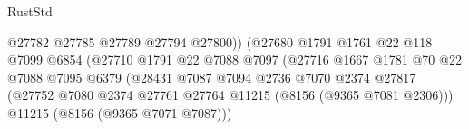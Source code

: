 \begin{lexlean}{RustStd}
\begin{coremodule}
                                                        @27782
                                                        @27785
                                                        @27789
                                                        @27794
                                                        @27800))
                                                    (@27680
                                                      @1791
                                                      @1761
                                                      @22
                                                      @118
                                                      @7099
                                                      @6854
                                                      (@27710
                                                        @1791
                                                        @22
                                                        @7088
                                                        @7097
                                                        (@27716
                                                          @1667
                                                          @1781
                                                          @70
                                                          @22
                                                          @7088
                                                          @7095
                                                          @6379
                                                          (@28431
                                                            @7087
                                                            @7094
                                                            @2736
                                                            @7070
                                                            @2374
                                                            @27817
                                                            (@27752
                                                              @7080
                                                              @2374
                                                              @27761
                                                              @27764
                                                              @11215
                                                              (@8156 (@9365 @7081 @2306)))
                                                            @11215
                                                            (@8156 (@9365 @7071 @7087)))

\end{coremodule}
\end{lexlean}
